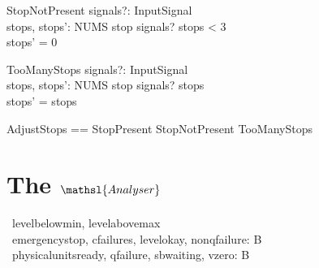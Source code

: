 \documentclass{report} %
\renewcommand{\boolean}{{\mathbb B}}
\begin{document}
\begin{schema}{StopNotPresent}
  signals?: \power InputSignal \\ %
  stops, stops': NUMS
  \where %
  stop \notin signals? \land stops < 3 \\ %
  stops' = 0
\end{schema}

\begin{schema}{TooManyStops}
  signals?: \power InputSignal \\ %
  stops, stops': NUMS
  \where %
  stop \notin signals? \land stops  \\ %
  stops' = stops
\end{schema}

\begin{zed}
  AdjustStops == StopPresent \lor StopNotPresent \lor TooManyStops
\end{zed}

\section{The $\mathsl{Analyser}$}

\begin{circus}
  \circchannel\ levelbelowmin, levelabovemax \\
  \circchannel\ emergencystop, cfailures, levelokay, nonqfailure: \boolean \\
  \circchannel\ physicalunitsready, qfailure, sbwaiting, vzero: \boolean
\end{circus}
\end{document}

